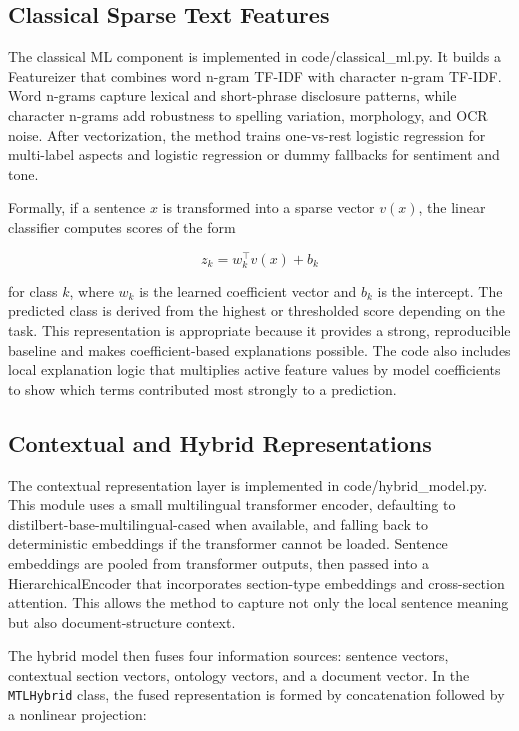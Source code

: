 \subsection{Classical Sparse Text Features}

The classical ML component is implemented in code/classical\_ml.py. It builds a Featureizer that combines word n-gram TF-IDF with character n-gram TF-IDF. Word n-grams capture lexical and short-phrase disclosure patterns, while character n-grams add robustness to spelling variation, morphology, and OCR noise. After vectorization, the method trains one-vs-rest logistic regression for multi-label aspects and logistic regression or dummy fallbacks for sentiment and tone.

Formally, if a sentence \(x\) is transformed into a sparse vector \(v(x)\),
the linear classifier computes scores of the form

\[
z_k = w_k^\top v(x) + b_k
\]

for class \(k\), where \(w_k\) is the learned coefficient vector and \(b_k\)
is the intercept. The predicted class is derived from the highest or thresholded score depending on the task. This representation is appropriate because it provides a strong, reproducible baseline and makes coefficient-based explanations possible. The code also includes local explanation logic that multiplies active feature values by model coefficients to show which terms contributed most strongly to a prediction.

\subsection{Contextual and Hybrid Representations}

The contextual representation layer is implemented in code/hybrid\_model.py. This module uses a small multilingual transformer encoder, defaulting to distilbert-base-multilingual-cased when available, and falling back to deterministic embeddings if the transformer cannot be loaded. Sentence embeddings are pooled from transformer outputs, then passed into a HierarchicalEncoder that incorporates section-type embeddings and cross-section attention. This allows the method to capture not only the local sentence meaning but also document-structure context.

The hybrid model then fuses four information sources: sentence vectors,
contextual section vectors, ontology vectors, and a document vector. In the
\texttt{MTLHybrid} class, the fused representation is formed by concatenation
followed by a nonlinear projection:


